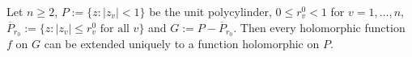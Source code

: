 Let $n \geqslant 2$, $P := \{ z : |z_v| < 1 \}$ be the unit polycylinder, $0 \leqslant r_v^0 < 1$ for $v = 1, \ldots, n$, $\overline{P}_{r_0} := \{ z : |z_v| \leqslant r_v^0 \text{ for all } v\}$ and $G := P - \overline{P}_{r_0}$. Then every holomorphic function $f$ on $G$ can be extended uniquely to a function holomorphic on $P$.
